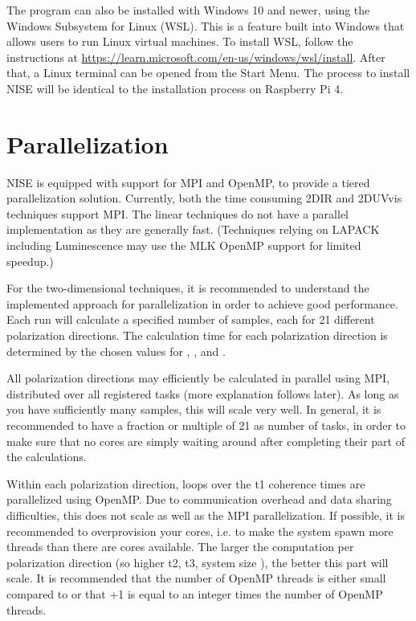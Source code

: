 The program can also be installed with Windows 10 and newer, using the Windows Subsystem for Linux (WSL). This is a feature built into Windows that allows users to run Linux virtual machines. To install WSL, follow the instructions at \url{https://learn.microsoft.com/en-us/windows/wsl/install}. After that, a Linux terminal can be opened from the Start Menu. The process to install NISE will be identical to the installation process on Raspberry Pi 4.

\section{Parallelization}
NISE is equipped with support for MPI and OpenMP, to provide a tiered parallelization solution. Currently, both the time consuming 2DIR and 2DUVvis techniques support MPI. The linear techniques do not have a parallel implementation as they are generally fast. (Techniques relying on LAPACK including Luminescence may use the MLK OpenMP support for limited speedup.)

For the two-dimensional techniques, it is recommended to understand the implemented approach for parallelization in order to achieve good performance. Each run will calculate a specified number of samples, each for 21 different polarization directions. The calculation time for each polarization direction is determined by the chosen values for , , and .

All polarization directions may efficiently be calculated in parallel using MPI, distributed over all registered tasks (more explanation follows later). As long as you have sufficiently many samples, this will scale very well. In general, it is recommended to have a fraction or multiple of 21 as number of tasks, in order to make sure that no cores are simply waiting around after completing their part of the calculations.

Within each polarization direction, loops over the t1 coherence times are parallelized using OpenMP. Due to communication overhead and data sharing difficulties, this does not scale as well as the MPI parallelization. If possible, it is recommended to overprovision your cores, i.e. to make the system spawn more threads than there are cores available. The larger the computation per polarization direction (so higher t2, t3, system size ), the better this part will scale. It is recommended that the number of OpenMP threads is either small compared to  or that +1 is equal to an integer times the number of OpenMP threads.


